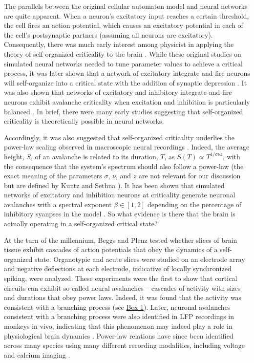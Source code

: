 The parallels between the original cellular automaton model and neural networks are quite apparent. When a neuron’s excitatory input reaches a certain threshold, the cell fires an action potential, which causes an excitatory potential in each of the cell’s postsynaptic partners (assuming all neurons are excitatory). Consequently, there was much early interest among physicist in applying the theory of self-organized criticality to the brain \cite{Corral1995, Herz1995}. While these original studies on simulated neural networks needed to tune parameter values to achieve a critical process, it was later shown that a network of excitatory integrate-and-fire neurons will self-organize into a critical state with the addition of synaptic depression \cite{Levina2007}. It was also shown that networks of excitatory and inhibitory integrate-and-fire neurons exhibit avalanche criticality when excitation and inhibition is particularly balanced \cite{Poil2012, Lombardi2017}. In brief, there were many early studies suggesting that self-organized criticality is theoretically possible in neural networks.

Accordingly, it was also suggested that self-organized criticality underlies the power-law scaling observed in macroscopic neural recordings \cite{Lombardi2017}. Indeed, the average height, $S$, of an avalanche is related to its duration, $T$, as $S(T)\propto T^{1/\sigma\nu z}$, with the consequence that the system's spectrum should also follow a power-law \cite{Kuntz2000} (the exact meaning of the parameters $\sigma$, $\nu$, and $z$ are not relevant for our discussion but are defined by Kuntz and Sethna \cite{Kuntz2000}). It has been shown that simulated networks of excitatory and inhibition neurons at criticality generate neuronal avalanches with a spectral exponent $\beta\in[1,2]$ depending on the percentage of inhibitory syanpses in the model \cite{Lombardi2017}. So what evidence is there that the brain is actually operating in a self-organized critical state?

At the turn of the millennium, Beggs and Plenz \cite{Beggs2003} tested whether slices of brain tissue exhibit cascades of action potentials that obey the dynamics of a self-organized state. Organotypic and acute slices were studied on an electrode array and negative deflections at each electrode, indicative of locally synchronized spiking, were analyzed. These experiments were the first to show that cortical circuits can exhibit so-called neural avalanches – cascades of activity with sizes and durations that obey power laws. Indeed, it was found that the activity was consistent with a branching process (see \hyperref[box:first]{Box 1}). Later, neuronal avalanches consistent with a branching process were also identified in LFP recordings in monkeys in vivo, indicating that this phenomenon may indeed play a role in physiological brain dynamics \cite{Petermann2009}. Power-law relations have since been identified across many species using many different recording modalities, including voltage \cite{Scott2014} and calcium imaging \cite{Bellay2015,Ponce-Alvarez2018}.

